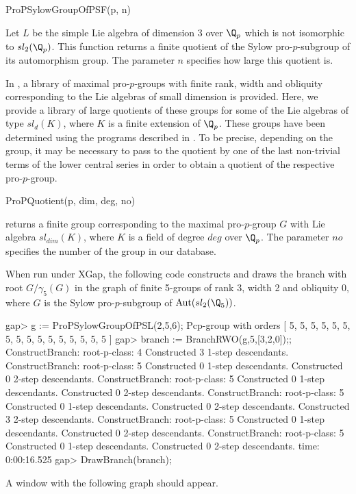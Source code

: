 \> ProPSylowGroupOfPSF(p, n)

Let $L$ be the simple Lie algebra of dimension $3$ over $\Q_p$
which is not isomorphic to $sl_2(\Q_p)$. This function  returns a
finite quotient of the Sylow pro-$p$-subgroup of its automorphism  
group. The parameter $n$ specifies how large this quotient is.

In \cite{KLGP97}, a library of maximal pro-$p$-groups with finite
rank, width and obliquity corresponding to the Lie algebras of small
dimension is provided. Here, we provide a library of large quotients
of these groups for some of the Lie algebras of type $sl_d(K)$, where
$K$ is a finite extension of $\Q_p$. 
These groups have been determined using the programs described in
\cite{KLGP97}. To be precise, depending on the group, it may be
necessary to pass to the quotient by one of the last non-trivial terms
of the lower central series in order to obtain a quotient of the
respective pro-$p$-group.

\> ProPQuotient(p, dim, deg, no)

returns a finite group corresponding to the maximal pro-$p$-group $G$
with Lie algebra $sl_{dim}(K)$, where $K$ is a field of
degree $deg$ over $\Q_p$. The parameter $no$ specifies the number of
the group in our database.


When run under XGap, the following code constructs and draws the
branch with root $G/\gamma_5(G)$ in the graph of finite 5-groups of
rank 3, width 2 and obliquity 0, where $G$ is the Sylow
pro-$p$-subgroup of ${\rm Aut}(sl_2(\Q_5))$.

\beginexample
gap> g := ProPSylowGroupOfPSL(2,5,6);
Pcp-group with orders [ 5, 5, 5, 5, 5, 5, 5, 5, 5, 5, 5, 5, 5, 5, 5, 5 ]
gap> branch := BranchRWO(g,5,[3,2,0]);;
ConstructBranch: root-p-class: 4
Constructed 3 1-step descendants.
ConstructBranch: root-p-class: 5
Constructed 0 1-step descendants.
Constructed 0 2-step descendants.
ConstructBranch: root-p-class: 5
Constructed 0 1-step descendants.
Constructed 0 2-step descendants.
ConstructBranch: root-p-class: 5
Constructed 0 1-step descendants.
Constructed 0 2-step descendants.
Constructed 3 2-step descendants.
ConstructBranch: root-p-class: 5
Constructed 0 1-step descendants.
Constructed 0 2-step descendants.
ConstructBranch: root-p-class: 5
Constructed 0 1-step descendants.
Constructed 0 2-step descendants.
time:  0:00:16.525
gap> DrawBranch(branch);
\endexample

A window with the following graph should appear.

\epsfxsize=8cm 